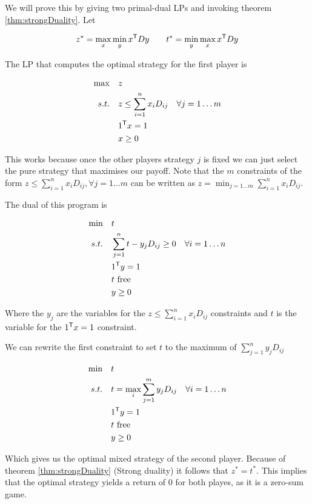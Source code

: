 \begin{pr} We will prove this by giving two primal-dual LPs and invoking theorem \ref{thm:strongDuality}. Let

\[z^* = \max_x \min_y {x}^\text{\upshape \sffamily T} Dy \qquad t^*= \min_y\max_x {x}^\text{\upshape \sffamily T} D y\]

The LP that computes the optimal strategy for the first player is

\begin{align*}
\max \quad & z\\
s.t.\quad & z \leq \sum_{i=1}^n x_i D_{ij} & \forall j=1\ldots m\\
&{1}^\text{\upshape \sffamily T} x = 1\\
&x\geq 0
\end{align*}

This works because once the other players strategy $j$ is fixed we can just select the pure strategy that maximises our payoff. Note that the $m$ constraints of the form $z \leq \sum_{i=1}^n x_i D_{ij}, \forall j=1 \ldots m$ can be written as $z=\min_{j=1\ldots m} \sum_{i=1}^n x_i D_{ij}$.

The dual of this program is

\begin{align*}
\min \quad & t \\
s.t.\quad & \sum_{j=1}^n t-y_jD_{ij}  \geq 0 & \forall i=1\ldots n\\
& {1}^\text{\upshape \sffamily T} y = 1\\
&t \text{ free}\\
&y\geq 0
\end{align*}

Where the $y_j$ are the variables for the $z \leq \sum_{i=1}^n x_i D_{ij}$ constraints and $t$ is the variable for the ${1}^\text{\upshape \sffamily T} x=1$ constraint. 

We can rewrite the first constraint to set $t$ to the maximum of $\sum_{j=1}^n y_jD_{ij}$

\begin{align*}
\min \quad & t \\
s.t.\quad & t = \max_i \sum^m_{j=1} y_j D_{ij} & \forall i=1\ldots n\\
& {1}^\text{\upshape \sffamily T} y = 1\\
&t \text{ free}\\
&y\geq 0
\end{align*}

Which gives us the optimal mixed strategy of the second player. Because of theorem \ref{thm:strongDuality} (Strong duality) it follows that $z^{*}=t^{*}$. This implies that the optimal strategy yields a return of $0$ for both playes, as it is a zero-sum game.
\end{pr}

